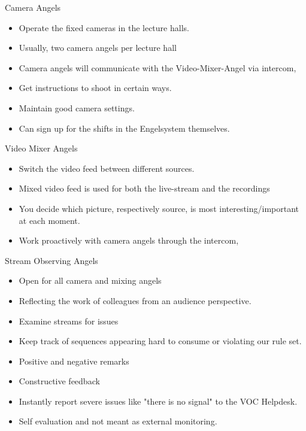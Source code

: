 \documentclass[aspectratio=169]{beamer}
\begin{document}
\begin{frame}{Camera Angels}
	\begin{itemize}
		\item Operate the fixed cameras in the lecture halls. 
		\item Usually, two camera angels per lecture hall 
		\item Camera angels will communicate with the Video-Mixer-Angel via intercom,
		\item Get instructions to shoot in certain ways. 
		\item Maintain good camera settings.
		\item Can sign up for the shifts in the Engelsystem themselves.
	\end{itemize}
\end{frame}

\begin{frame}{Video Mixer Angels}
	\begin{itemize}
		\item Switch the video feed between different sources. 
		\item Mixed video feed is used for both the live-stream and the recordings 
		\item You decide which picture, respectively source, is most interesting/important at each moment.
		\item Work proactively with camera angels through the intercom, 
	\end{itemize}
\end{frame}

\begin{frame}{Stream Observing Angels}
	\begin{itemize}
		\item Open for all camera and mixing angels
		\item Reflecting the work of colleagues from an audience perspective.
		\item Examine streams for issues 
		\item Keep track of sequences appearing hard to consume or violating our rule set. 
		\item Positive and negative remarks 
		\item Constructive feedback 
		\item Instantly report severe issues like "there is no signal" to the VOC Helpdesk.%
		\item Self evaluation and not meant as external monitoring. 
	\end{itemize}
\end{frame}
\end{document}
